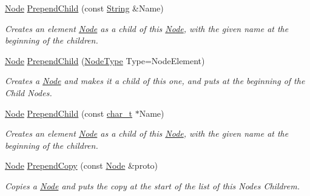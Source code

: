 \begin{DoxyCompactItemize}
\hyperlink{classMezzanine_1_1xml_1_1Node}{Node} \hyperlink{classMezzanine_1_1xml_1_1Node_a2a1ed011242565f5f8f7541977311fd4}{PrependChild} (const \hyperlink{namespaceMezzanine_1_1xml_a3ddf35656ecc38b6fa1d0364d9ad3b2c}{String} \&Name)
\begin{DoxyCompactList}\small\item\em Creates an element \hyperlink{classMezzanine_1_1xml_1_1Node}{Node} as a child of this \hyperlink{classMezzanine_1_1xml_1_1Node}{Node}, with the given name at the beginning of the children. \item\end{DoxyCompactList}\item 
\hyperlink{classMezzanine_1_1xml_1_1Node}{Node} \hyperlink{classMezzanine_1_1xml_1_1Node_afa84d785eb34c7f594fb6205ba9459c3}{PrependChild} (\hyperlink{namespaceMezzanine_1_1xml_a524d867e34ff408b8f45a51b7924cb80}{NodeType} Type=NodeElement)
\begin{DoxyCompactList}\small\item\em Creates a \hyperlink{classMezzanine_1_1xml_1_1Node}{Node} and makes it a child of this one, and puts at the beginning of the Child Nodes. \item\end{DoxyCompactList}\item 
\hyperlink{classMezzanine_1_1xml_1_1Node}{Node} \hyperlink{classMezzanine_1_1xml_1_1Node_a5d055f3328c147b712980b5ca49e4564}{PrependChild} (const \hyperlink{namespaceMezzanine_1_1xml_a29b8a47c179e9895c4e9e66c45d1dbbc}{char\_\-t} $\ast$Name)
\begin{DoxyCompactList}\small\item\em Creates an element \hyperlink{classMezzanine_1_1xml_1_1Node}{Node} as a child of this \hyperlink{classMezzanine_1_1xml_1_1Node}{Node}, with the given name at the beginning of the children. \item\end{DoxyCompactList}\item 
\hyperlink{classMezzanine_1_1xml_1_1Node}{Node} \hyperlink{classMezzanine_1_1xml_1_1Node_a1667a10461c554d35997eb132dc0b052}{PrependCopy} (const \hyperlink{classMezzanine_1_1xml_1_1Node}{Node} \&proto)
\begin{DoxyCompactList}\small\item\em Copies a \hyperlink{classMezzanine_1_1xml_1_1Node}{Node} and puts the copy at the start of the list of this Nodes Childrem. \item\end{DoxyCompactList}\item 

\end{DoxyCompactItemize}
